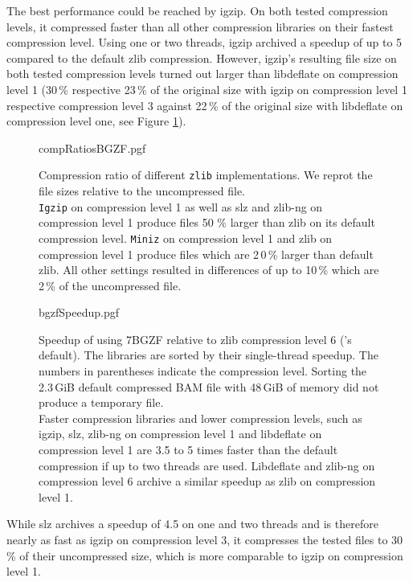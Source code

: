 The best performance could be reached by igzip. On both tested compression levels, it compressed faster than all other compression libraries on their fastest compression level. Using one or two threads, igzip archived a speedup of up to 5 compared to the default zlib compression. However, igzip's resulting file size on both tested compression levels turned out larger than libdeflate on compression level 1 (30\,\% respective 23\,\% of the original size with igzip on compression level 1 respective compression level 3 against 22\,\% of the original size with libdeflate on compression level one, see Figure \ref{fig:bgzfComps}). 

\begin{figure}[!htb]
        {compRatiosBGZF.pgf}
    \caption{Compression ratio of different \texttt{zlib} implementations. We reprot the file sizes relative to the uncompressed file. \\
    \texttt{Igzip} on compression level 1 as well as slz and zlib-ng on compression level 1 produce files 50\,\,\% larger than zlib on its default compression level. \texttt{Miniz} on compression level 1 and zlib on compression level 1 produce files which are 2\,0\,\% larger than default zlib. All other settings resulted in differences of up to 10\,\% which are 2\,\% of the uncompressed file.}
    \label{fig:bgzfComps}
\end{figure}
\begin{figure}[!htb]
        {bgzfSpeedup.pgf}
    \caption{Speedup of \sort using 7BGZF relative to zlib compression level 6 (\sort's default). The libraries are sorted by their single-thread speedup. The numbers in parentheses indicate the compression level. Sorting the 2.3\,GiB default compressed BAM file with 48\,GiB of memory did not produce a temporary file. \\
    Faster compression libraries and lower compression levels, such as igzip, slz, zlib-ng on compression level 1 and libdeflate on compression level 1 are 3.5 to 5 times faster than the default compression if up to two threads are used. Libdeflate and zlib-ng on compression level 6 archive a similar speedup as zlib on compression level 1.}
    \label{fig:bgzfspeed}
\end{figure}
While slz archives a speedup of 4.5 on one and two threads  and is therefore nearly as fast as igzip on compression level 3, it compresses the tested files to 30\,\% of their uncompressed size, which is more comparable to igzip on compression level 1.

